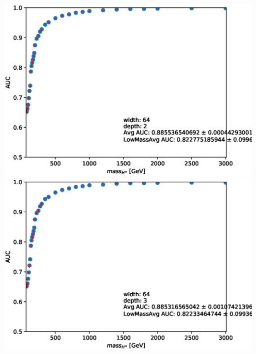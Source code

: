 \documentclass[aspectratio=169,xcolor=table]{beamer}
\begin{document}
\begin{frame}
\begin{columns}
      \includegraphics[height=.25\textheight,keepaspectratio=true]{AUC_Plots/model_GB_1024_channel_taulep_mass_80to3000_ntracks_1_nfolds_5_fold_4_nvars_19_batch_size_1024_epochs_1000_dense_layer_size_64_activation_function_LeakyRelu_depth_2_loss_binary_crossentropy_dropout_0.1_alpha_0.05.eps}
      \includegraphics[height=.25\textheight,keepaspectratio=true]{AUC_Plots/model_GB_1024_channel_taulep_mass_80to3000_ntracks_1_nfolds_5_fold_4_nvars_19_batch_size_1024_epochs_1000_dense_layer_size_64_activation_function_LeakyRelu_depth_3_loss_binary_crossentropy_dropout_0.1_alpha_0.05.eps}

\end{columns}
\end{frame}
\end{document}
